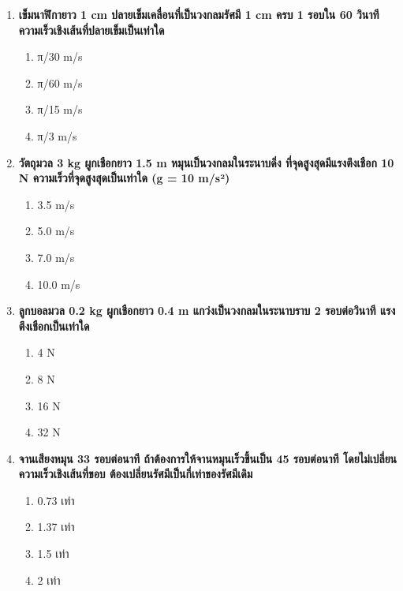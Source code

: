 \documentclass[12pt]{article}
\begin{document}
\begin{enumerate}
\begin{enumerate}[label=\alph*)]
\item 4,000 N
\item 8,000 N
\item 16,000 N
\item 32,000 N
\end{enumerate}
\item \textbf{เข็มนาฬิกายาว 1 cm ปลายเข็มเคลื่อนที่เป็นวงกลมรัศมี 1 cm ครบ 1 รอบใน 60 วินาที ความเร็วเชิงเส้นที่ปลายเข็มเป็นเท่าใด}
\begin{enumerate}[label=\alph*)]
\item π/30 m/s
\item π/60 m/s
\item π/15 m/s
\item π/3 m/s
\end{enumerate}
\item \textbf{วัตถุมวล 3 kg ผูกเชือกยาว 1.5 m หมุนเป็นวงกลมในระนาบดิ่ง ที่จุดสูงสุดมีแรงตึงเชือก 10 N ความเร็วที่จุดสูงสุดเป็นเท่าใด (g = 10 m/s²)}
\begin{enumerate}[label=\alph*)]
\item 3.5 m/s
\item 5.0 m/s
\item 7.0 m/s
\item 10.0 m/s
\end{enumerate}
\item \textbf{ลูกบอลมวล 0.2 kg ผูกเชือกยาว 0.4 m แกว่งเป็นวงกลมในระนาบราบ 2 รอบต่อวินาที แรงตึงเชือกเป็นเท่าใด}
\begin{enumerate}[label=\alph*)]
\item 4 N
\item 8 N
\item 16 N
\item 32 N
\end{enumerate}
\item \textbf{จานเสียงหมุน 33 รอบต่อนาที ถ้าต้องการให้จานหมุนเร็วขึ้นเป็น 45 รอบต่อนาที โดยไม่เปลี่ยนความเร็วเชิงเส้นที่ขอบ ต้องเปลี่ยนรัศมีเป็นกี่เท่าของรัศมีเดิม}
\begin{enumerate}[label=\alph*)]
\item 0.73 เท่า
\item 1.37 เท่า
\item 1.5 เท่า
\item 2 เท่า
\end{enumerate}
\end{enumerate}
\end{document}

